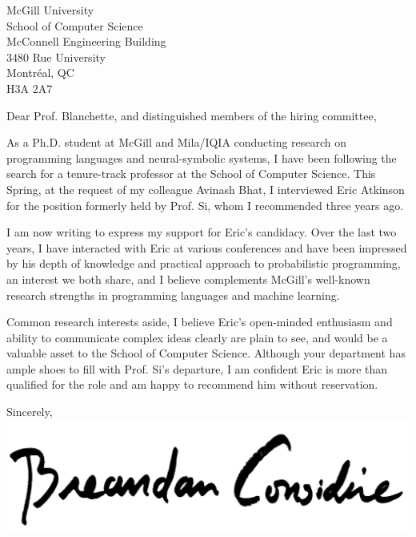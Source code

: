 \documentclass{letter}
\begin{document}
\begin{letter}{McGill University\\ School of Computer Science\\ McConnell Engineering Building\\ 3480 Rue University\\ Montr\'eal, QC\\ H3A 2A7}
  \opening{Dear Prof. Blanchette, and distinguished members of the hiring committee,}
  \vspace{12pt}

  As a Ph.D. student at McGill and Mila/IQIA conducting research on programming languages and neural-symbolic systems, I have been following the search for a tenure-track professor at the School of Computer Science. This Spring, at the request of my colleague Avinash Bhat, I interviewed Eric Atkinson for the position formerly held by Prof. Si, whom I recommended three years ago.

  I am now writing to express my support for Eric's candidacy. Over the last two years, I have interacted with Eric at various conferences and have been impressed by his depth of knowledge and practical approach to probabilistic programming, an interest we both share, and I believe complements McGill's well-known research strengths in programming languages and machine learning.

  Common research interests aside, I believe Eric's open-minded enthusiasm and ability to communicate complex ideas clearly are plain to see, and would be a valuable asset to the School of Computer Science. Although your department has ample shoes to fill with Prof. Si's departure, I am confident Eric is more than qualified for the role and am happy to recommend him without reservation.
  \vspace{10pt}

  \closing{Sincerely,\\
  \includegraphics[scale=0.06]{signature}\\
  }
\end{letter}
\end{document}
